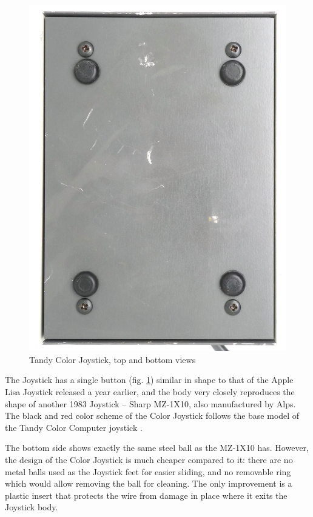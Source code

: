\documentclass[11pt, a4paper]{article}
\begin{document}
\begin{figure}[h]
    \includegraphics[scale=0.55]{1975_Tektronix_4952_Joystick/bottom_30.jpg}
    \caption{Tandy Color Joystick, top and bottom views}
    \label{fig:TektronixJoystickTopAndBottom}
\end{figure}

The Joystick has a single button (fig. \ref{fig:TektronixJoystickTopAndBottom}) similar in shape to that of the Apple Lisa Joystick released a year earlier, and the body very closely reproduces the shape of another 1983 Joystick -- Sharp MZ-1X10, also manufactured by Alps. The black and red color scheme of the Color Joystick follows the base model of the Tandy Color Computer joystick \cite{hierophant}.

The bottom side shows exactly the same steel ball as the MZ-1X10 has. However, the design of the Color Joystick is much cheaper compared to it: there are no metal balls used as the Joystick feet for easier sliding, and no removable ring which would allow removing the ball for cleaning. The only improvement is a plastic insert that protects the wire from damage in place where it exits the Joystick body.
\end{document}
